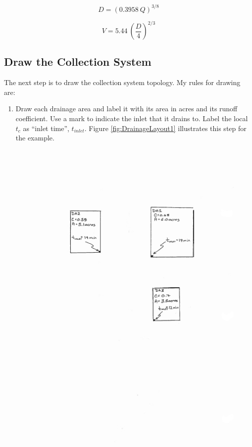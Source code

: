 \documentclass[12pt]{article}
\begin{document}
\begin{equation}
D = (0.3958~Q)^{3/8}
\label{eqn:manningsD}
\end{equation}

\begin{equation}
V = 5.44~(\frac{D}{4})^{2/3}
\label{eqn:manningsV}
\end{equation}
\clearpage
\subsection*{Draw the Collection System}
The next step is to draw the collection system topology.
My rules for drawing are:
\begin{enumerate}
\item Draw each drainage area and label it with its area in acres and its runoff coefficient.
Use a mark to indicate the inlet that it drains to.
Label the local $t_c$ as ``inlet time'', $t_{inlet}$.
Figure \ref{fig:DrainageLayout1} illustrates this step for the example.
\begin{figure}[ht!] %
\centering
   \includegraphics[height=7in]{DrainageLayout1.jpg}

\end{figure}
\end{enumerate}
\end{document}

